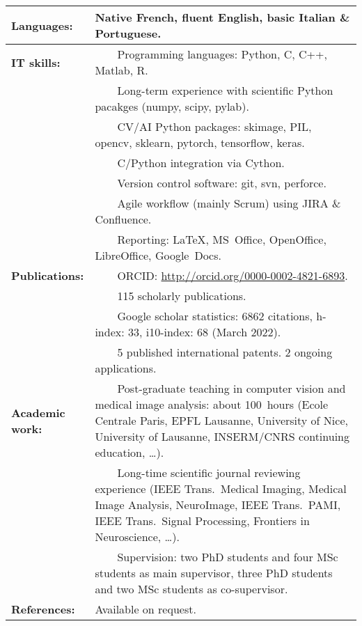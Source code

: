 \documentclass[english,10pt,a4paper]{scrartcl}
\newcommand{\tabitem}{~~\llap{\textbullet}~~}
\begin{document}
\begin{tabular}{p{0.2\linewidth}p{0.8\linewidth}}
  \textbf{Languages:} & Native French, fluent English, basic Italian \& Portuguese.\\
  \hline
  \textbf{IT skills:} &
  \tabitem Programming languages: Python, C, C++, Matlab, R.\\
  & \tabitem Long-term experience with scientific Python pacakges (numpy, scipy, pylab).\\
  & \tabitem CV/AI Python packages: skimage, PIL, opencv, sklearn, pytorch, tensorflow, keras.\\
  & \tabitem  C/Python integration via Cython.\\
  & \tabitem Version control software: git, svn, perforce.\\
  & \tabitem Agile workflow (mainly Scrum) using JIRA \& Confluence.\\
  & \tabitem Reporting: \LaTeX, MS~Office, OpenOffice, LibreOffice, Google~Docs.\\
  \hline
  \textbf{Publications:} &
  \tabitem ORCID: \url{http://orcid.org/0000-0002-4821-6893}. \\
  & \tabitem 115 scholarly publications.\\
  & \tabitem Google scholar statistics: 6862 citations, h-index: 33, i10-index: 68 (March 2022).\\
  & \tabitem 5 published international patents. 2 ongoing applications.\\
  \hline
  \textbf{Academic work:} & 
  \tabitem Post-graduate teaching in computer vision and medical image analysis: about 100~hours (Ecole Centrale Paris, EPFL Lausanne, University of Nice, University of Lausanne, INSERM/CNRS continuing education, \ldots).\\
  & \tabitem Long-time scientific journal reviewing experience (IEEE Trans.~Medical Imaging, Medical Image Analysis, NeuroImage, IEEE Trans.~PAMI, IEEE Trans.~Signal Processing, Frontiers in Neuroscience, \ldots).\\
  & \tabitem Supervision: two PhD students and four MSc students as main supervisor, three PhD students and two MSc students as co-supervisor.\\
  \hline
  \textbf{References:} & Available on request.
\end{tabular}



%
\end{document}
